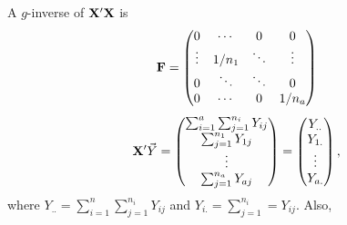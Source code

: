 A $ g $-inverse of $ \mathbf{X}'\mathbf{X} $ is
\[ \mathbf{F}=\begin{pmatrix}
        0      & \cdots & 0      & 0      \\
        \vdots & 1/n_1  & \ddots & \vdots \\
        0      & \ddots & \ddots & 0      \\
        0      & \cdots & 0      & 1/n_a
    \end{pmatrix} \]
\[ \mathbf{X}'\vec{Y}=\begin{pmatrix}
        \sum_{i=1}^{a}\sum_{j=1}^{n_i}Y_{ij} \\
        \sum_{j=1}^{n_1}Y_{1j}               \\
        \vdots                               \\
        \sum_{j=1}^{n_a}Y_{aj}
    \end{pmatrix}=\begin{pmatrix}
        Y_{..} \\
        Y_{1.} \\
        \vdots \\
        Y_{a.}
    \end{pmatrix}, \]
where $ Y_{..}=\sum_{i=1}^{n}\sum_{j=1}^{n_i}Y_{ij} $
and $ Y_{i.}=\sum_{j=1}^{n_i}=Y_{ij} $. Also,
